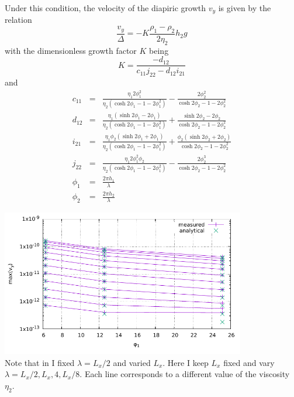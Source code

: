 Under this condition, the velocity of the diapiric growth
$v_y$ is given by the relation
\[
\frac{v_y}{\Delta} = - K \frac{\rho_1-\rho_2}{2 \eta_2} h_2 g
\]
with the dimensionless growth factor $K$ being
\[
K=\frac{-d_{12}}{c_{11}j_{22}-d_{12}i_{21}}
\]
and 
\begin{eqnarray}
c_{11} &=& \frac{\eta_1 2 \phi_1^2}{\eta_2(\cosh 2\phi_1 - 1 - 2\phi_1^2)} - \frac{2\phi_2^2}{\cosh 2\phi_2 - 1 - 2 \phi_2^2}\\
d_{12} &=& \frac{\eta_1(\sinh 2\phi_1 -2\phi_1)}{\eta_2(\cosh 2\phi_1 -1 -2\phi_1^2)} + \frac{\sinh 2\phi_2 - 2\phi_2}{\cosh 2\phi_2 -1 -2\phi_2^2} \\
i_{21} &=& \frac{\eta_1\phi_2 (\sinh 2 \phi_1 + 2 \phi_1)}{\eta_2(\cosh 2\phi_1 -1 -2\phi_1^2)} 
+ \frac{\phi_2 (\sinh 2\phi_2 + 2\phi_2)}{\cosh 2\phi_2 -1 -2\phi_2^2} \\
j_{22} &=& \frac{\eta_1 2 \phi_1^2 \phi_2}{\eta_2(\cosh 2\phi_1 -1-2\phi_1^2)} - \frac{2\phi_2^3}{ \cosh 2\phi_2 -1 -2\phi_2^2}\\
\phi_1&=&\frac{2\pi h_1}{\lambda}\\
\phi_2&=&\frac{2\pi h_2}{\lambda}
\end{eqnarray}


\begin{center}
  \includegraphics[width=0.8\textwidth]{python_codes/fieldstone_40/images/plot}\\
  {\small  Note that in \cite{thie11} I fixed $\lambda=L_x/2$ and varied $L_x$. Here I keep $L_x$ fixed
  and vary $\lambda=L_x/2,L_x,4,L_x/8$. Each line corresponds to a different value of the viscosity $\eta_2$.} 
\end{center}



